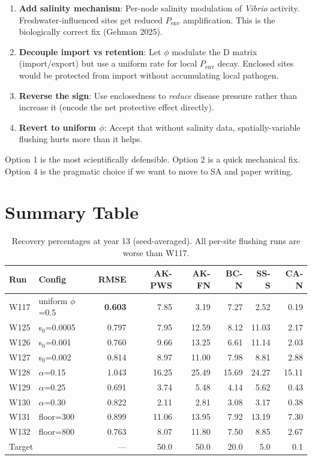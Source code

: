 \documentclass[11pt]{article}
\begin{document}
\begin{enumerate}
    \item \textbf{Add salinity mechanism}: Per-node salinity modulation of \textit{Vibrio} activity. Freshwater-influenced sites get reduced $P_\text{env}$ amplification. This is the biologically correct fix (Gehman 2025).
    \item \textbf{Decouple import vs retention}: Let $\phi$ modulate the D matrix (import/export) but use a uniform rate for local $P_\text{env}$ decay. Enclosed sites would be protected from import without accumulating local pathogen.
    \item \textbf{Reverse the sign}: Use enclosedness to \textit{reduce} disease pressure rather than increase it (encode the net protective effect directly).
    \item \textbf{Revert to uniform $\phi$}: Accept that without salinity data, spatially-variable flushing hurts more than it helps.
\end{enumerate}

Option 1 is the most scientifically defensible. Option 2 is a quick mechanical fix. Option 4 is the pragmatic choice if we want to move to SA and paper writing.

\section{Summary Table}

\begin{table}[h]
\centering
\begin{tabular}{llrrrrrr}
\toprule
Run & Config & RMSE & AK-PWS & AK-FN & BC-N & SS-S & CA-N \\
\midrule
W117 & uniform $\phi$=0.5 & \textbf{0.603} & 7.85 & 3.19 & 7.27 & 2.52 & 0.19 \\
\midrule
W125 & s$_0$=0.0005 & 0.797 & 7.95 & 12.59 & 8.12 & 11.03 & 2.17 \\
W126 & s$_0$=0.001 & 0.760 & 9.66 & 13.25 & 6.61 & 11.14 & 2.03 \\
W127 & s$_0$=0.002 & 0.814 & 8.97 & 11.00 & 7.98 & 8.81 & 2.88 \\
W128 & $\alpha$=0.15 & 1.043 & 16.25 & 25.49 & 15.69 & 24.27 & 15.11 \\
W129 & $\alpha$=0.25 & 0.691 & 3.74 & 5.48 & 4.14 & 5.62 & 0.43 \\
W130 & $\alpha$=0.30 & 0.822 & 2.11 & 2.81 & 3.08 & 3.17 & 0.38 \\
W131 & floor=300 & 0.899 & 11.06 & 13.95 & 7.92 & 13.19 & 7.30 \\
W132 & floor=800 & 0.763 & 8.07 & 11.80 & 7.50 & 8.85 & 2.67 \\
\midrule
\multicolumn{2}{l}{Target} & --- & 50.0 & 50.0 & 20.0 & 5.0 & 0.1 \\
\bottomrule
\end{tabular}
\caption{Recovery percentages at year 13 (seed-averaged). All per-site flushing runs are worse than W117.}
\end{table}
\end{document}
